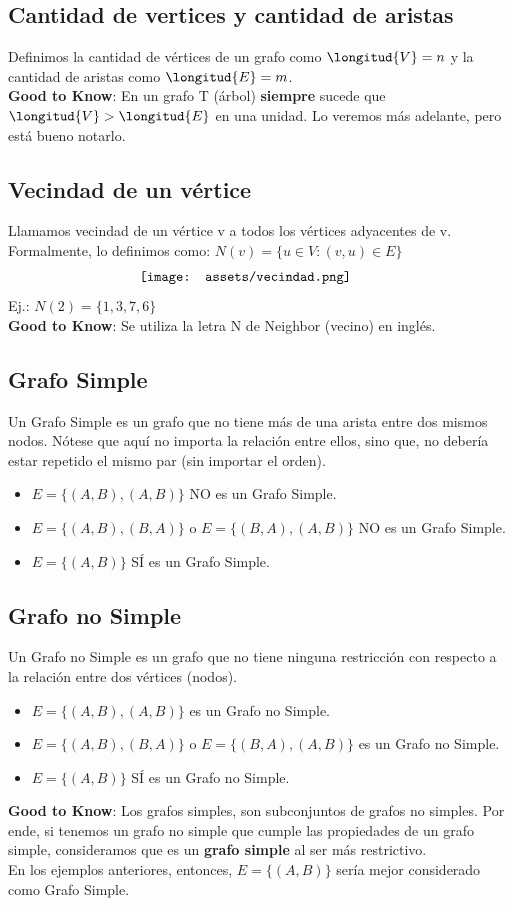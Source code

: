 \documentclass[10pt,a4paper]{article}
\begin{document}
\subsection*{Cantidad de vertices y cantidad de aristas}
Definimos la cantidad de vértices de un grafo como $\longitud{V} = n$ y la cantidad de aristas como $\longitud{E} = m$. \\
\textbf{Good to Know}: En un grafo T (árbol) \textbf{siempre} sucede que $\longitud{V} > \longitud{E}$ en una unidad. Lo veremos más adelante, pero está bueno notarlo.
\subsection*{Vecindad de un vértice}
Llamamos vecindad de un vértice v a todos los vértices adyacentes de v. \\
Formalmente, lo definimos como: $N(v) = \{u \in V : (v, u) \in E\}$ 
\[\begin{minipage}[b]{0.5\textwidth}
    \texttt{[image: assets/vecindad.png]}
\end{minipage}\]
Ej.: $N(2) = \{1, 3, 7, 6\}$ \\
\textbf{Good to Know}: Se utiliza la letra N de Neighbor (vecino) en inglés.
\subsection*{Grafo Simple}
Un Grafo Simple es un grafo que no tiene más de una arista entre dos mismos nodos. Nótese que aquí no importa la relación entre ellos, sino que, no debería estar repetido el mismo par (sin importar el orden).
\begin{itemize}
    \item $E = \{(A,B), (A,B)\}$ NO es un Grafo Simple.
    \item $E = \{(A,B), (B,A)\}$ o $E = \{(B,A), (A,B)\}$ NO es un Grafo Simple.
    \item $E = \{(A,B)\}$ SÍ es un Grafo Simple.
\end{itemize}
\subsection*{Grafo no Simple}
Un Grafo no Simple es un grafo que no tiene ninguna restricción con respecto a la relación entre dos vértices (nodos). 
\begin{itemize}
    \item $E = \{(A,B), (A,B)\}$ es un Grafo no Simple.
    \item $E = \{(A,B), (B,A)\}$ o $E = \{(B,A), (A,B)\}$ es un Grafo no Simple.
    \item $E = \{(A,B)\}$ SÍ es un Grafo no Simple.
\end{itemize}
\textbf{Good to Know}: Los grafos simples, son subconjuntos de grafos no simples. Por ende, si tenemos un grafo no simple que cumple las propiedades de un grafo simple, consideramos que es un \textbf{grafo simple} al ser más restrictivo. \\
En los ejemplos anteriores, entonces, $E = \{(A,B)\}$ sería mejor considerado como Grafo Simple.
\end{document}
